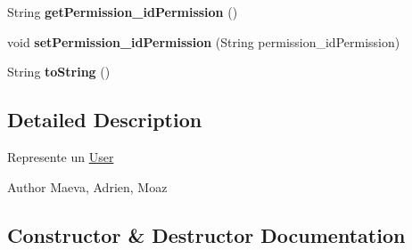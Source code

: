 \begin{DoxyCompactItemize}
\item 
String {\bfseries get\+Permission\+\_\+id\+Permission} ()\hypertarget{classcom_1_1ecetech_1_1bti4_1_1itproject_1_1classified_1_1beans_1_1_user_a5d4584e8b95d84f387f7a7a53a39cb18}{}\label{classcom_1_1ecetech_1_1bti4_1_1itproject_1_1classified_1_1beans_1_1_user_a5d4584e8b95d84f387f7a7a53a39cb18}

\item 
void {\bfseries set\+Permission\+\_\+id\+Permission} (String permission\+\_\+id\+Permission)\hypertarget{classcom_1_1ecetech_1_1bti4_1_1itproject_1_1classified_1_1beans_1_1_user_a136371a93386e79e9707d691c1c6a826}{}\label{classcom_1_1ecetech_1_1bti4_1_1itproject_1_1classified_1_1beans_1_1_user_a136371a93386e79e9707d691c1c6a826}

\item 
String {\bfseries to\+String} ()\hypertarget{classcom_1_1ecetech_1_1bti4_1_1itproject_1_1classified_1_1beans_1_1_user_a2f740d2f78ef0baf9c907bf92ca5875d}{}\label{classcom_1_1ecetech_1_1bti4_1_1itproject_1_1classified_1_1beans_1_1_user_a2f740d2f78ef0baf9c907bf92ca5875d}

\end{DoxyCompactItemize}


\subsection{Detailed Description}
Represente un \hyperlink{classcom_1_1ecetech_1_1bti4_1_1itproject_1_1classified_1_1beans_1_1_user}{User} \begin{DoxyAuthor}{Author}
Maeva, Adrien, Moaz 
\end{DoxyAuthor}


\subsection{Constructor \& Destructor Documentation}
